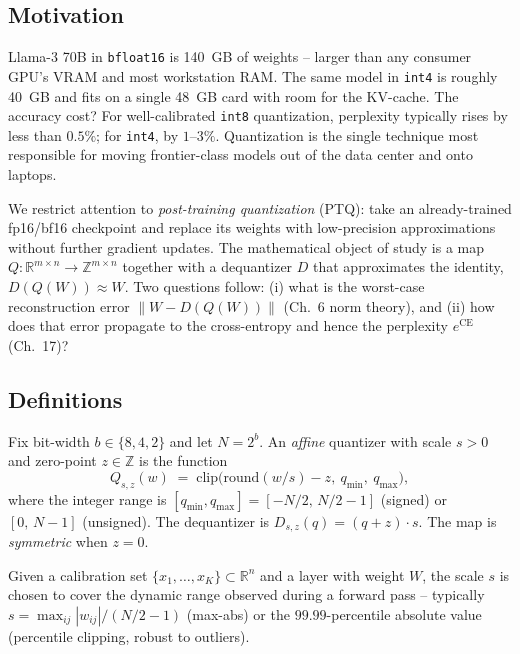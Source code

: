 \subsection*{Motivation}

Llama-3 70B in \texttt{bfloat16} is 140~GB of weights -- larger than any consumer GPU's VRAM and most workstation RAM. The same model in \texttt{int4} is roughly 40~GB and fits on a single 48~GB card with room for the KV-cache. The accuracy cost? For well-calibrated \texttt{int8} quantization, perplexity typically rises by less than $0.5\%$; for \texttt{int4}, by $1$--$3\%$. Quantization is the single technique most responsible for moving frontier-class models out of the data center and onto laptops.

We restrict attention to \emph{post-training quantization} (PTQ): take an already-trained fp16/bf16 checkpoint and replace its weights with low-precision approximations without further gradient updates. The mathematical object of study is a map $Q : \mathbb{R}^{m\times n}\to\mathbb{Z}^{m\times n}$ together with a dequantizer $D$ that approximates the identity, $D(Q(W))\approx W$. Two questions follow: (i) what is the worst-case reconstruction error $\|W - D(Q(W))\|$ (Ch.~6 norm theory), and (ii) how does that error propagate to the cross-entropy and hence the perplexity $e^{\mathrm{CE}}$ (Ch.~17)?

\subsection*{Definitions}

\begin{definition}
Fix bit-width $b\in\{8,4,2\}$ and let $N=2^b$. An \emph{affine} quantizer with scale $s>0$ and zero-point $z\in\mathbb{Z}$ is the function
\[
Q_{s,z}(w) \;=\; \mathrm{clip}\!\big(\mathrm{round}(w/s) - z,\ q_{\min},\ q_{\max}\big),
\]
where the integer range is $[q_{\min},q_{\max}]=[-N/2,\,N/2-1]$ (signed) or $[0,\,N-1]$ (unsigned). The dequantizer is $D_{s,z}(q)=(q+z)\cdot s$. The map is \emph{symmetric} when $z=0$.
\end{definition}

\begin{definition}[Calibration]
Given a calibration set $\{x_1,\dots,x_K\}\subset\mathbb{R}^n$ and a layer with weight $W$, the scale $s$ is chosen to cover the dynamic range observed during a forward pass -- typically $s=\max_{ij}|w_{ij}|/(N/2-1)$ (max-abs) or the $99.99$-percentile absolute value (percentile clipping, robust to outliers).
\end{definition}

